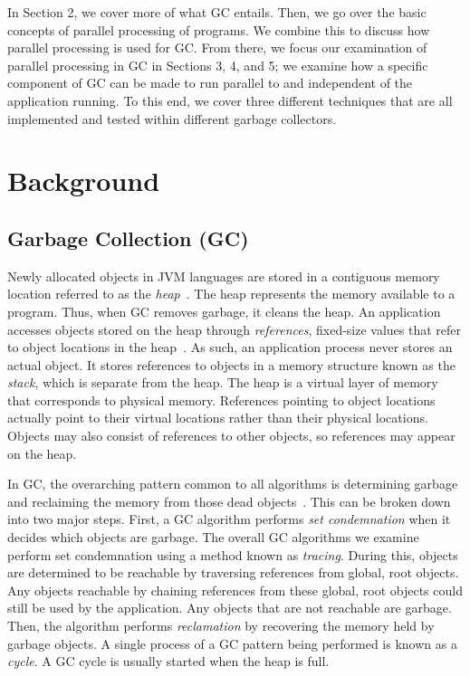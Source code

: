 \documentclass{sig-alternate}
\begin{document}
In Section 2, we cover more of what GC entails. Then, we go over the
basic concepts of parallel processing of programs. We combine this 
to discuss how parallel processing is used for GC.
From there, we focus our examination of parallel processing in GC in Sections 3, 4, and 5;
we examine how a specific component of GC can be made to run parallel to
and independent of the application running. To this end, we cover three
different techniques that are all implemented and tested within different
garbage collectors.


\section{Background}
\label{sec:background}


\subsection{Garbage Collection (GC)}
\label{sec:garbageCollection}

Newly allocated objects in JVM languages are stored in a contiguous memory location referred
to as the \emph{heap}~\cite{oracle:heap}. The heap represents the memory available to a program.
Thus, when GC removes garbage, it cleans the heap.
An application accesses objects stored on the heap through \emph{references},
fixed-size values that refer to object locations in the heap~\cite{reilly:reference}. 
As such, an application process never stores
an actual object. It stores references to objects in a memory structure known
as the \emph{stack}, which is separate from the heap.
The heap is a virtual layer of memory that corresponds to physical memory.
References pointing to object locations actually point to their
virtual locations rather than their physical locations. Objects may also 
consist of references to other objects, so references may appear on the heap.

In GC, the overarching pattern common to all algorithms is determining garbage
and reclaiming the memory from those dead objects~\cite{wiki:gc}. This can be broken down into two major steps.
First, a GC algorithm performs \emph{set condemnation} when it decides which objects are 
garbage. The overall GC algorithms we examine perform set condemnation using a method 
known as \emph{tracing}. During this, objects are determined to be reachable by 
traversing references from global, root objects. Any objects reachable by chaining references
from these global, root objects could still be used by the application. 
Any objects that are not reachable are garbage.  Then, the algorithm performs 
\emph{reclamation} by recovering the memory held by garbage objects. A single
process of a GC pattern being performed is known as a \emph{cycle}. A GC cycle
is usually started when the heap is full.
\end{document}
